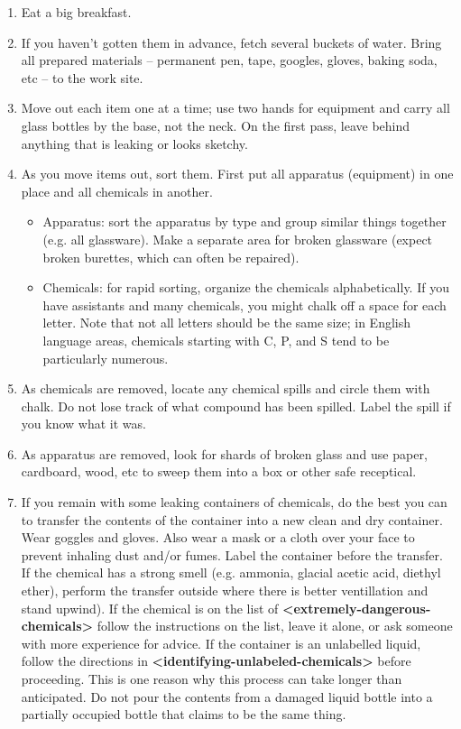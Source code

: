 \documentclass{report}
\begin{document}
\begin{enumerate}
\item{Eat a big breakfast.}
\item{If you haven't gotten them in advance, fetch several buckets of water. Bring all prepared materials -- permanent pen, tape, googles, gloves, baking soda, etc -- to the work site.}
\item{Move out each item one at a time; use two hands for equipment and carry all glass bottles by the base, not the neck. On the first pass, leave behind anything that is leaking or looks sketchy.}
\item{As you move items out, sort them. First put all apparatus (equipment) in one place and all chemicals in another.
\begin{itemize}
\item{Apparatus: sort the apparatus by type and group similar things together (e.g. all glassware). Make a separate area for broken glassware (expect broken burettes, which can often be repaired).}
\item{Chemicals: for rapid sorting, organize the chemicals alphabetically. If you have assistants and many chemicals, you might chalk off a space for each letter. Note that not all letters should be the same size; in English language areas, chemicals starting with C, P, and S tend to be particularly numerous.}
\end{itemize}
}
\item{As chemicals are removed, locate any chemical spills and circle them with chalk. Do not lose track of what compound has been spilled. Label the spill if you know what it was.}
\item{As apparatus are removed, look for shards of broken glass and use paper, cardboard, wood, etc to sweep them into a box or other safe receptical.}
\item{If you remain with some leaking containers of chemicals, do the best you can to transfer the contents of the container into a new clean and dry container. Wear goggles and gloves. Also wear a mask or a cloth over your face to prevent inhaling dust and/or fumes. Label the container before the transfer. If the chemical has a strong smell (e.g. ammonia, glacial acetic acid, diethyl ether), perform the transfer outside where there is better ventillation and stand upwind). If the chemical is on the list of \textbf{\textless extremely-dangerous-chemicals\textgreater } follow the instructions on the list, leave it alone, or ask someone with more experience for advice. If the container is an unlabelled liquid, follow the directions in \textbf{\textless identifying-unlabeled-chemicals\textgreater } before proceeding. This is one reason why this process can take longer than anticipated. Do not pour the contents from a damaged liquid bottle into a partially occupied bottle that claims to be the same thing.}

\end{enumerate}
\end{document}
